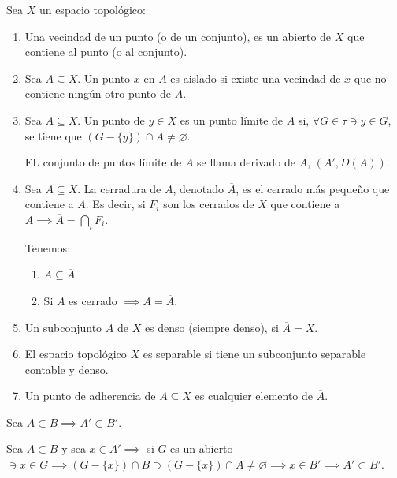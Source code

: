 \begin{definicion}
    Sea $X$ un espacio topológico: 
    \begin{enumerate}
        \item Una vecindad de un punto (o de un conjunto), es un abierto de $X$ que contiene al punto (o al conjunto).
        \item Sea $A\subseteq X$. Un punto $x$ en $A$ es aislado si existe una vecindad de $x$ que no contiene ningún otro punto de $A$. 
        \item Sea $A\subseteq X$. Un punto de $y\in X$ es un punto límite de $A$ si, $\forall G\in \tau\ni y\in G$, se tiene que $(G-\{y\})\cap A\neq\varnothing$. 
        \begin{cajita}
            EL conjunto de puntos límite de $A$ se llama derivado de $A$, $(A',D(A))$.  
        \end{cajita}
        \item Sea $A\subseteq X$. La cerradura de $A$, denotado $\overline{A}$, es el cerrado más pequeño que contiene a $A$. Es decir, si $F_i$ son los cerrados de $X$ que contiene a $A\implies \overline{A}=\bigcap_i F_i$. 
        \begin{cajita}
            Tenemos:
            \begin{enumerate}
                \item $A\subseteq \overline{A}$
                \item Si $A$ es cerrado $\implies A=\overline{A}$.
            \end{enumerate}
        \end{cajita}
        \item Un subconjunto $A$ de $X$ es denso (siempre denso), si $\overline{A}=X$.
        \item El espacio topológico $X$ es separable si tiene un subconjunto separable contable y denso. 
        \item Un punto de adherencia de $A\subseteq X$ es cualquier elemento de $\overline{A}$.
    \end{enumerate}
\end{definicion}

\begin{prop}
    Sea $A\subset B\implies A'\subset B'$.
    \begin{prop}
        Sea $A\subset B$ y sea $x\in A'\implies$ si $G$ es un abierto $\ni x\in G\implies (G-\{x\})\cap B\supset (G-\{x\})\cap A\neq \varnothing\implies x\in B'\implies A'\subset B'$.
    \end{prop}
\end{prop}

